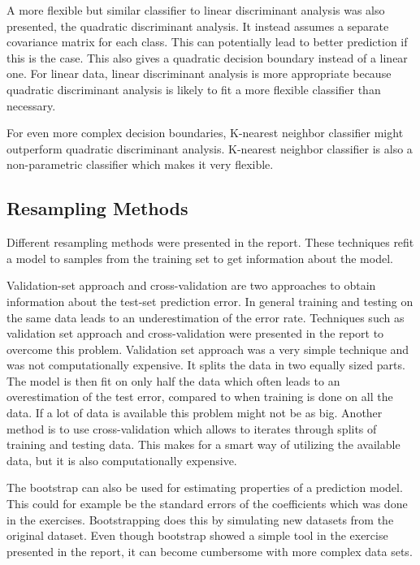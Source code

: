 A more flexible but similar classifier to linear discriminant analysis was also presented, the quadratic discriminant analysis. It instead assumes a separate covariance matrix for each class. This can potentially lead to better prediction if this is the case. This also gives a quadratic decision boundary instead of a linear one. For linear data, linear discriminant analysis is more appropriate because quadratic discriminant analysis is likely to fit a more flexible classifier than necessary.

For even more complex decision boundaries, K-nearest neighbor classifier might outperform quadratic discriminant analysis. K-nearest neighbor classifier is also a non-parametric classifier which makes it very flexible.

\subsection{Resampling Methods}
Different resampling methods were presented in the report. These techniques refit a model to samples from the training set to get information about the model. 

Validation-set approach and cross-validation are two approaches to obtain information about the test-set prediction error. In general training and testing on the same data leads to an underestimation of the error rate. Techniques such as validation set approach and cross-validation were presented in the report to overcome this problem. Validation set approach was a very simple technique and was not computationally expensive. It splits the data in two equally sized parts. The model is then fit on only half the data which often leads to an overestimation of the test error, compared to when training is done on all the data. If a lot of data is available this problem might not be as big. Another method is to use cross-validation which allows to iterates through splits of training and testing data. This makes for a smart way of utilizing the available data, but it is also computationally expensive.

The bootstrap can also be used for estimating properties of a prediction model. This could for example be the standard errors of the coefficients which was done in the exercises. Bootstrapping does this by simulating new datasets from the original dataset. Even though bootstrap showed a simple tool in the exercise presented in the report, it can become cumbersome with more complex data sets.

